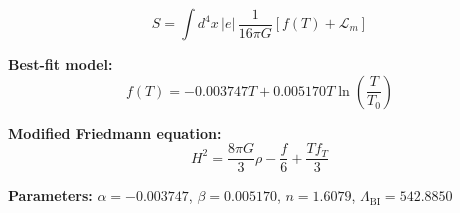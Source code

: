 
\begin{equation}
  S = \int d^4x \, |e| \, \frac{1}{16\pi G} \left[ f(T) + \mathcal{L}_m \right]
\end{equation}

\textbf{Best-fit model:}
\begin{equation}
  f(T) = -0.003747 T + 0.005170 T \ln\!\left(\frac{T}{T_0}\right)
\end{equation}

\textbf{Modified Friedmann equation:}
\begin{equation}
  H^2 = \frac{8\pi G}{3} \rho - \frac{f}{6} + \frac{T f_T}{3}
\end{equation}

\textbf{Parameters:}
$\alpha = -0.003747$, \quad
$\beta = 0.005170$, \quad
$n = 1.6079$, \quad
$\Lambda_{\text{BI}} = 542.8850$